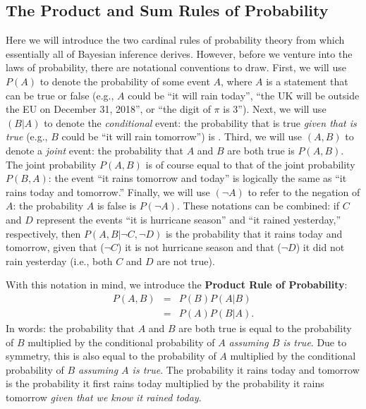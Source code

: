 \subsection{The Product and Sum Rules of Probability}
Here we will introduce the two cardinal rules of probability theory from which essentially all of Bayesian inference derives. However, before we venture into the laws of probability, there are notational conventions to draw. First, we will use $P(A)$ to denote the probability of some event $A$, where $A$ is a statement that can be true or false (e.g., $A$ could be ``it will rain today'', ``the UK will be outside the EU on December 31, 2018'', or ``the  digit of $\pi$ is 3''). Next, we will use  {$(B|A)$} to denote the \emph{conditional} event: the probability that  is true \emph{given that  is true} (e.g., $B$ could be ``it will rain tomorrow'') is .  Third, we will use $(A,B)$ to denote a \emph{joint} event: the probability that $A$ and $B$ are both true is $P(A,B)$. The joint probability $P(A,B)$ is of course equal to that of the joint probability $P(B,A)$: the event ``it rains tomorrow and today'' is logically the same as ``it rains today and tomorrow.'' Finally, we will use $(\neg A)$ to refer to the negation of $A$: the probability $A$ is false is $P(\neg A)$. These notations can be combined: if $C$ and $D$ represent the events ``it is hurricane season'' and ``it rained yesterday,'' respectively, then $P(A,B|\neg C,\neg D)$ is the probability that it rains today and tomorrow, given that ($\neg C$) it is not hurricane season and that ($\neg D$) it did not rain yesterday (i.e., both $C$ and $D$ are not true).

With this notation in mind, we introduce the \textbf{Product Rule of Probability}:
\begin{equation}
\begin{array}{rcl}
P(A,B) &=& P(B)P(A|B)\\ 
&=& P(A)P(B|A).
\end{array}
\label{eq:prodrule}
\end{equation}
In words: the probability that $A$ and $B$ are both true is equal to the probability of $B$ multiplied by the conditional probability of $A$ \textit{assuming $B$ is true}.  Due to symmetry, this is also equal to the probability of $A$ multiplied by the conditional probability of $B$ \textit{assuming $A$ is true}. The probability it rains today and tomorrow is the probability it first rains today multiplied by the probability it rains tomorrow \textit{given that we know it rained today}.

